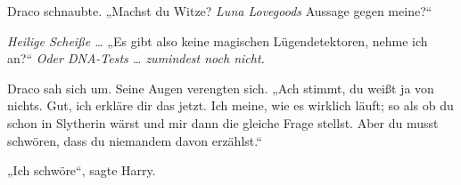 Draco schnaubte.
„Machst du Witze? \emph{Luna Lovegoods} Aussage gegen meine?“

\emph{Heilige Scheiße …}
„Es gibt also keine magischen Lügendetektoren, nehme ich an?“ \emph{Oder DNA-Tests … zumindest noch nicht.}

Draco sah sich um. Seine Augen verengten sich.
„Ach stimmt, du weißt ja von nichts. Gut, ich erkläre dir das jetzt. Ich meine, wie es wirklich läuft; so als ob du schon in Slytherin wärst und mir dann die gleiche Frage stellst. Aber du musst schwören, dass du niemandem davon erzählst.“






„Ich schwöre“, sagte Harry.

